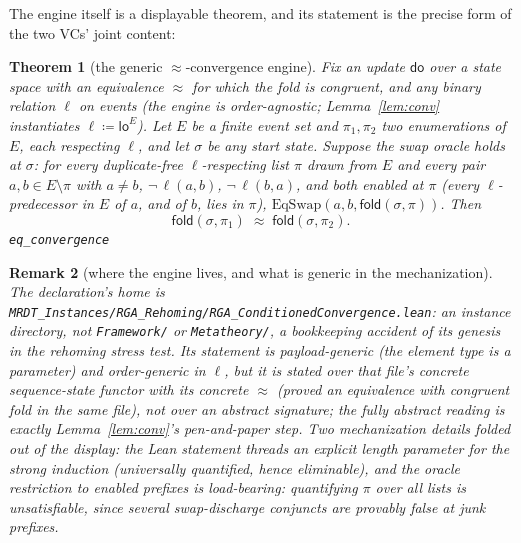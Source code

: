 \documentclass[11pt]{article}
\newtheorem{theorem}{Theorem}[section]
\newtheorem{remark}[theorem]{Remark}
\newcommand{\loE}[1]{\mathsf{lo}^{#1}}
\newcommand{\lean}[1]{\texttt{#1}}
\newcommand{\st}{\sigma}
\newcommand{\dodo}{\mathsf{do}}
\newcommand{\eqobs}{\approx}
\newcommand{\fold}{\mathsf{fold}}
\begin{document}
The engine itself is a displayable theorem, and its statement is the precise form of
the two VCs' joint content:

\begin{theorem}[the generic $\eqobs$-convergence engine]\label{thm:eqconv}
Fix an update $\dodo$ over a state space with an equivalence $\eqobs$ for which the
fold is congruent, and \emph{any} binary relation $\ell$ on events (the engine is
order-agnostic; Lemma~\ref{lem:conv} instantiates $\ell \coloneqq \loE{E}$). Let $E$
be a finite event set and $\pi_1, \pi_2$ two enumerations of $E$, each respecting
$\ell$, and let $\st$ be any start state. Suppose the swap oracle holds at $\st$:
for every duplicate-free $\ell$-respecting list
$\pi$ drawn from $E$ and every pair $a, b \in E \setminus \pi$ with $a \neq b$,
$\neg\,\ell(a,b)$, $\neg\,\ell(b,a)$, and both enabled at $\pi$ (every
$\ell$-predecessor in $E$ of $a$, and of $b$, lies in $\pi$),
$\mathrm{EqSwap}(a, b, \fold(\st, \pi))$. Then
\[
  \fold(\st, \pi_1) \;\eqobs\; \fold(\st, \pi_2).
\]
\hfill\lean{eq\_convergence}
\end{theorem}

\begin{remark}[where the engine lives, and what is generic in the mechanization]
\label{rem:eqconvhome}
The declaration's home is
\lean{MRDT\_Instances/RGA\_Rehoming/RGA\_ConditionedConvergence.lean}: an instance
directory, not \lean{Framework/} or \lean{Metatheory/}, a bookkeeping accident of its
genesis in the rehoming stress test. Its statement is payload-generic (the element
type is a parameter) and order-generic in $\ell$, but it is stated over that file's
concrete sequence-state functor with its concrete $\eqobs$ (proved an equivalence with
congruent fold in the same file), not over an abstract signature; the fully abstract
reading is exactly Lemma~\ref{lem:conv}'s pen-and-paper step. Two mechanization
details folded out of the display: the Lean statement threads an explicit length
parameter for the strong induction (universally quantified, hence eliminable), and the
oracle restriction to enabled prefixes is load-bearing: quantifying $\pi$ over all
lists is unsatisfiable, since several swap-discharge conjuncts are provably false at
junk prefixes.
\end{remark}
\end{document}
